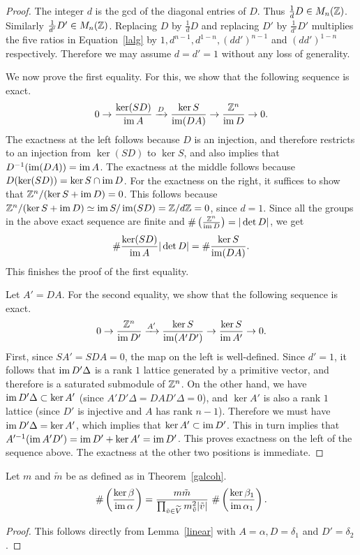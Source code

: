 \begin{proof}
 The integer $d$ is the gcd of the diagonal entries of $D$. Thus $\tfrac{1}{d} D \in M_n(\mathbb Z)$. Similarly $\tfrac{1}{d'} D' \in M_n(\mathbb Z)$. Replacing $D$ by $\tfrac{1}{d}D$ and replacing $D'$ by $\tfrac{1}{d'}D'$ multiplies the five ratios in Equation~\eqref{lalg} by $1,d^{n-1},d^{1-n},(dd')^{n-1}$ and $(dd')^{1-n}$ respectively. Therefore we may assume $d=d'=1$ without any loss of generality.
 
We now prove the first equality. For this, we show that the following sequence is exact.
\[ 0 \rightarrow \frac{\ker (SD)}{\operatorname{im} A} \xrightarrow{D} \frac{\ker S}{\operatorname{im} (DA)} \rightarrow \frac{\mathbb Z^n}{\operatorname{im} D}  \rightarrow 0 . \]
The exactness at the left follows because $D$ is an injection, and therefore restricts to an injection from $\ker (SD)$ to $\ker S$, and also implies that $D^{-1} (\operatorname{im} (DA)) = \operatorname{im} A$. The exactness at the middle follows because $D(\ker (SD)) = \ker S \cap \operatorname{im} D$. For the exactness on the right, it suffices to show that $\mathbb Z^n/(\ker S + \operatorname{im} D) = 0$. This follows because $\mathbb Z^n/(\ker S + \operatorname{im} D) \simeq \operatorname{im} S/\operatorname{im}(SD) = \mathbb Z/d\mathbb Z = 0$, since $d=1$. Since all the groups in the above exact sequence are finite and $\# \left( \tfrac{\mathbb Z^n}{\operatorname{im} D} \right) = |\det D|$, we get 
\[ \# \frac{\ker (S D) }{\operatorname{im} A} |\det D| =  \# \frac{\ker S }{\operatorname{im} (D A)} .\]
This finishes the proof of the first equality.

Let $A' = DA$. For the second equality, we show that the following sequence is exact.
\[ 0 \rightarrow \frac{\mathbb Z^n}{\operatorname{im} D'} \xrightarrow{A'} \frac{\ker S}{\operatorname{im} (A'D')} \rightarrow \frac{\ker S}{\operatorname{im} A'} \rightarrow 0  .\]
First, since $SA' = SDA = 0$, the map on the left is well-defined. Since $d'=1$, it follows that $\operatorname{im} D'\Delta$ is a rank $1$ lattice generated by a primitive vector, and therefore is a saturated submodule of $\mathbb Z^n$. On the other hand, we have $\operatorname{im} D' \Delta \subset \ker A'$ (since $A'D'\Delta = DAD'\Delta = 0$), and $\ker A'$ is also a rank $1$ lattice (since $D'$ is injective and $A$ has rank $n-1$). Therefore we must have $\operatorname{im} D' \Delta = \ker A'$, which implies that $\ker A' \subset \operatorname{im} D'$. This in turn implies that $A'^{-1}(\operatorname{im} A'D') = \operatorname{im} D' + \ker A' = \operatorname{im} D'$. This proves exactness on the left of the sequence above. The exactness at the other two positions is immediate.
\end{proof}

\begin{lemma}\label{compare}
Let $m$ and $\tilde{m}$ be as defined as in Theorem~\ref{galcoh}. 
\[ \# \left( \frac{\ker{\beta}}{\operatorname{im}{\alpha}} \right)  = \frac{m \tilde{m}}{\prod_{\tilde{v} \in \widetilde{V}} m_{\tilde{v}}^2 |\tilde{v}| } \ \# \left( \frac{\ker{\beta_1}}{\operatorname{im}{\alpha_1}} \right) .\] 
\end{lemma}
\begin{proof}
This follows directly from Lemma~\ref{linear} with $A = \alpha, D = \delta_1$ and $D' = \delta_2$. \qedhere
\end{proof}

